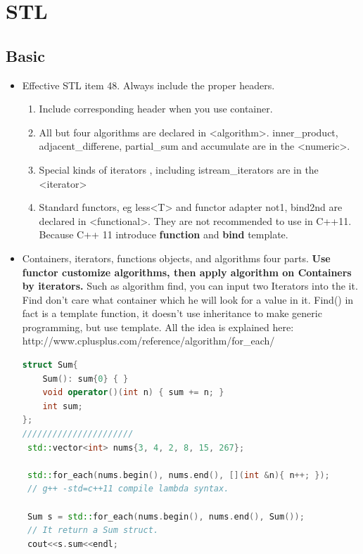 \documentclass[a4paper,11pt,twoside]{book}
\begin{document}
\chapter{STL}
\section{Basic}
\begin{itemize}
\item Effective STL item 48. Always include the proper headers.
\begin{enumerate}
\item Include corresponding header when you use container.
\item All but four algorithms are declared in <algorithm>. inner\_product, adjacent\_differene, partial\_sum and accumulate are in the <numeric>.
\item Special kinds of iterators , including istream\_iterators are in the <iterator>
\item Standard functors, eg less<T> and functor adapter not1, bind2nd are declared in <functional>. They are not recommended to use in C++11. Because C++ 11 introduce \textbf{function} and \textbf{bind} template.
\end{enumerate}


\item Containers, iterators, functions objects, and algorithms four parts. \textbf{Use functor customize algorithms, then apply algorithm on Containers by iterators.} Such as algorithm find, you can input two Iterators into the it.  Find don't care what container which he will look for a value in it.  Find() in fact is a template function, it doesn't use inheritance to make generic programming, but use template.   All the idea is explained here:\newline
http://www.cplusplus.com/reference/algorithm/for\_each/

\begin{lstlisting}[frame=single, language=c++]
struct Sum{
    Sum(): sum{0} { }
    void operator()(int n) { sum += n; }
    int sum;
};
//////////////////////
 std::vector<int> nums{3, 4, 2, 8, 15, 267};

 std::for_each(nums.begin(), nums.end(), [](int &n){ n++; });
 // g++ -std=c++11 compile lambda syntax.

 Sum s = std::for_each(nums.begin(), nums.end(), Sum());
 // It return a Sum struct.
 cout<<s.sum<<endl;
\end{lstlisting}

\end{itemize}
\end{document}
